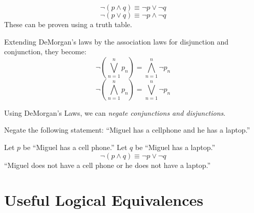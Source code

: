 \begin{equation}
  \neg (p \land q) \equiv \neg p \lor \neg q
\end{equation}
\begin{equation}
  \neg(p \lor q) \equiv \neg p \land \neg q
\end{equation}
These can be proven using a truth table.
\begin{table}[H]
  \centering
  \caption{A proof of DeMorgan's first law.}
\end{table}

Extending DeMorgan's laws by the association laws for disjunction and conjunction, they become:
\begin{equation}
 \neg\left(\bigvee^n_{n=1} p_n\right)=\bigwedge^n_{n=1} \neg p_n
\end{equation}
\begin{equation}
 \neg\left(\bigwedge^n_{n=1} p_n\right)=\bigvee^n_{n=1} \neg p_n
\end{equation}

Using DeMorgan's Laws, we can \emph{negate conjunctions and disjunctions}.

\begin{ex}
  Negate the following statement:
  ``Miguel has a cellphone and he has a laptop.''
  \begin{sol}
    Let \(p\) be ``Miguel has a cell phone.''
    Let \(q\) be ``Miguel has a laptop.''
    \[ \neg(p \land q) \equiv \neg p \lor \neg q \]
    ``Miguel does not have a cell phone or he does not have a laptop.''
  \end{sol}
\end{ex}

\section{Useful Logical Equivalences}

